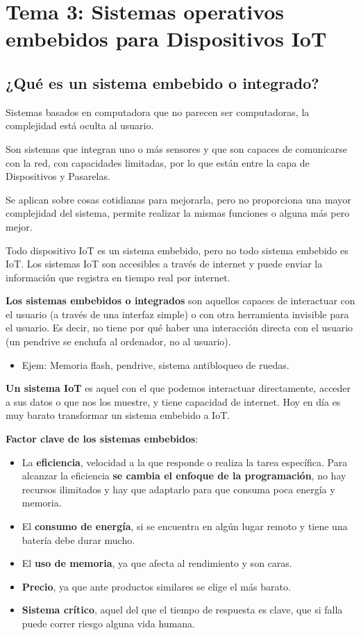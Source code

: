 \documentclass[12pt, twoside, openright]{report} %
\begin{document}
\chapter{Tema 3: Sistemas operativos embebidos para Dispositivos
  IoT}

\section{¿Qué es un sistema embebido o integrado?}

Sistemas basados en computadora que no parecen ser computadoras, la complejidad está oculta al usuario.

Son sistemas que integran uno o más sensores y que son capaces de
comunicarse con la red, con capacidades limitadas, por lo que están
entre la capa de Dispositivos y Pasarelas.

Se aplican sobre cosas cotidianas para mejorarla, pero no
proporciona una mayor complejidad del sistema, permite realizar la
mismas funciones o alguna más pero mejor.

Todo dispositivo IoT es un sistema embebido, pero no todo sistema
embebido es IoT. Los sistemas IoT son accesibles a través de internet y
puede enviar la información que registra en tiempo real por internet.

\textbf{Los sistemas embebidos o integrados} son aquellos capaces de
interactuar con el usuario (a través de una interfaz simple) o con otra herramienta invisible para el usuario. Es decir, no tiene por qué haber una interacción directa con el usuario (un pendrive se enchufa al ordenador, no al usuario).

\begin{itemize}
	\item Ejem: Memoria flash, pendrive, sistema antibloqueo de ruedas.
\end{itemize}

\textbf{Un sistema IoT} es aquel con el que podemos interactuar
directamente, acceder a sus datos o que nos los muestre, y tiene
capacidad de internet. Hoy en día es muy barato transformar un sistema
embebido a IoT.

\textbf{Factor clave de los sistemas embebidos}:

\begin{itemize}
	\item La \textbf{eficiencia}, velocidad a la que responde o realiza la tarea
	      específica. Para alcanzar la eficiencia \textbf{se cambia el enfoque
		      de la programación}, no hay recursos ilimitados y hay que adaptarlo
	      para que consuma poca energía y memoria.
	\item El \textbf{consumo de energía}, si se encuentra en algún lugar remoto
	      y tiene una batería debe durar mucho.
	\item El \textbf{uso de memoria}, ya que afecta al rendimiento y son caras.
	\item \textbf{Precio}, ya que ante productos similares se elige el más
	      barato.
	\item \textbf{Sistema crítico}, aquel del que el tiempo de respuesta es
	      clave, que si falla puede correr riesgo alguna vida humana.
\end{itemize}
\end{document}
